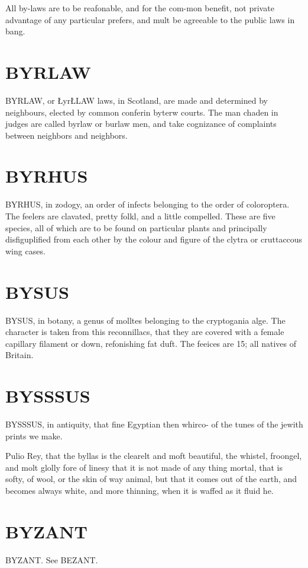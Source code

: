 \documentclass{article}
\begin{document}
All by-laws are to be reafonable, and for the com-mon benefit, not private advantage of any particular prefers, and mult be agreeable to the public laws in bang.

\section*{BYRLAW}
BYRLAW, or ŁyrŁLAW laws, in Scotland, are made and determined by neighbours, elected by common conferin byterw courts. The man chaden in judges are called byrlaw or burlaw men, and take cognizance of complaints between neighbors and neighbors.

\section*{BYRHUS}
BYRHUS, in zodogy, an order of infects belonging to the order of coloroptera. The feelers are clavated, pretty folkl, and a little compelled. These are five species, all of which are to be found on particular plants and principally disfiguplified from each other by the colour and figure of the clytra or cruttaccous wing cases.

\section*{BYSUS}
BYSUS, in botany, a genus of molltes belonging to the cryptogania alge. The character is taken from this reconnillacs, that they are covered with a female capillary filament or down, refonishing fat duft. The feeices are 15; all natives of Britain.

\section*{BYSSSUS}
BYSSSUS, in antiquity, that fine Egyptian then whirco- of the tunes of the jewith prints we make.

Pulio Rey, that the byllas is the clearelt and moft beautiful, the whistel, froongel, and molt glolly fore of linesy that it is not made of any thing mortal, that is softy, of wool, or the skin of way animal, but that it comes out of the earth, and becomes always white, and more thinning, when it is waffed as it fluid he.

\section*{BYZANT}
BYZANT. See BEZANT.
\end{document}
